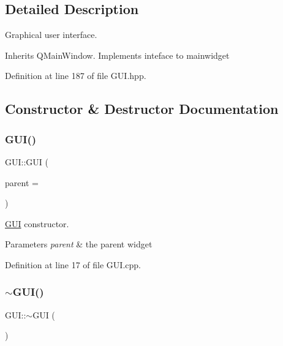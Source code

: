 \subsection{Detailed Description}
Graphical user interface. 

Inherits Q\+Main\+Window. Implements inteface to mainwidget 

Definition at line 187 of file G\+U\+I.\+hpp.



\subsection{Constructor \& Destructor Documentation}
\mbox{\label{classGUI_acb0ba8c6fc121d814d30560e2c29f2fe}} 
\subsubsection{\texorpdfstring{G\+U\+I()}{GUI()}}
{\footnotesize\ttfamily G\+U\+I\+::\+G\+UI (\begin{DoxyParamCaption}\item[{Q\+Widget $\ast$}]{parent = {} }\end{DoxyParamCaption})}



\mbox{\hyperlink{classGUI}{G\+UI}} constructor. 


\begin{DoxyParams}{Parameters}
{\em parent} & the parent widget \\
\hline
\end{DoxyParams}


Definition at line 17 of file G\+U\+I.\+cpp.

\mbox{\label{classGUI_ac9cae2328dcb5d83bdfaeca49a2eb695}} 
\subsubsection{\texorpdfstring{$\sim$\+G\+U\+I()}{~GUI()}}
{\footnotesize\ttfamily G\+U\+I\+::$\sim$\+G\+UI (\begin{DoxyParamCaption}{ }\end{DoxyParamCaption})\hspace{0.3cm}{\ttfamily [inline]}}



